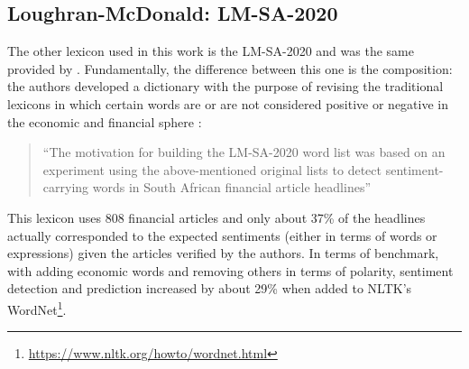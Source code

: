 


\subsection{Loughran-McDonald: LM-SA-2020}  \label{subsec:loughran}

The other lexicon used in this work is the LM-SA-2020 and was the same provided by \cite{loughran2011liability}. Fundamentally, the difference between this one is the composition: the authors developed a dictionary with the purpose of revising the traditional lexicons in which certain words are or are not considered positive or negative in the economic and financial sphere \citep[p. 35]{loughran2011liability}:

\begin{quote}
    ``The motivation for building the LM-SA-2020 word list was based on an experiment using the above-mentioned original lists to detect sentiment-carrying words in South African financial article headlines''\citep[p. 1]{lmdata}
\end{quote}

This lexicon uses 808 financial articles and only about 37\% of the headlines actually corresponded to the expected sentiments (either in terms of words or expressions) given the articles verified by the authors\citep{loughran2011liability}. In terms of benchmark, with adding economic words and removing others in terms of polarity, sentiment detection and prediction increased by about 29\% when added to NLTK's WordNet\footnote{\url{https://www.nltk.org/howto/wordnet.html}}.\\

